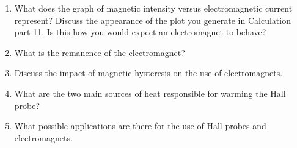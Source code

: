 \begin{enumerate}[resume]
\item What does the graph of magnetic intensity versus electromagnetic current represent? Discuss the appearance of the plot you generate in Calculation part 11. Is this how you would expect an electromagnet to behave?

\item What is the remanence of the electromagnet? 

\item Discuss the impact of magnetic hysteresis on the use of electromagnets.

\item What are the two main sources of heat responsible for warming the Hall probe? 

\item What possible applications are there for the use of Hall probes and electromagnets.

\end{enumerate}


\AtEndDocument{\clearpage\ifodd\value{page}\else\null\clearpage\fi} %


